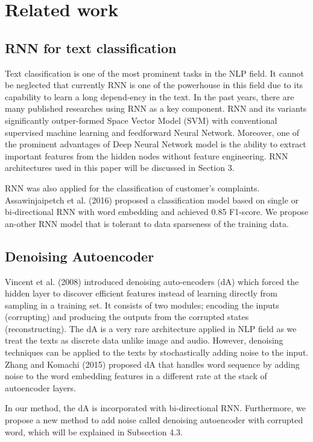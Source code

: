 \setlength{\parindent}{0.5cm}
\section{Related work}
\subsection{RNN for text classification}
Text classification is one of the most prominent tasks in the NLP field.
It cannot be neglected that currently RNN is one of the powerhouse in this
field due to its capability to learn a long depend-ency in the text.
In the past years, there are many published researches using RNN as a key component.
RNN and its variants significantly outper-formed Space Vector Model (SVM)
with conventional supervised machine learning and feedforward Neural Network.
Moreover, one of the prominent advantages of Deep Neural Network model
is the ability to extract important features from the hidden nodes without
feature engineering.
RNN architectures used in this paper will be discussed in Section 3.


RNN was also applied for the classification of customer's complaints.
Assawinjaipetch et al. (2016) \cite{assawinjaipetch-etal-2016-recurrent} proposed
a classification model based on single or bi-directional RNN
with word embedding and achieved 0.85 F1-score.
We propose an-other RNN model that is tolerant to data sparseness of the training data.


\subsection{Denoising Autoencoder}
Vincent et al. (2008) \cite{vincent2008extracting} introduced denoising auto-encoders (dA) which
forced the hidden layer to discover efficient features instead of learning directly
from sampling in a training set. It consists of two modules; encoding the inputs
(corrupting) and producing the outputs from the corrupted states (reconstructing).
The dA is a very rare architecture applied in NLP field as we treat the texts
as discrete data unlike image and audio.
However, denoising techniques can be applied to the texts by stochastically
adding noise to the input.
Zhang and Komachi (2015) \cite{zhang2015japanese} proposed dA that
handles word sequence by adding noise to the word embedding features in a different
rate at the stack of autoencoder layers. 


In our method, the dA is incorporated with bi-directional RNN.
Furthermore, we propose a new method to add noise called denoising autoencoder 
with corrupted word, which will be explained in Subsection 4.3.

